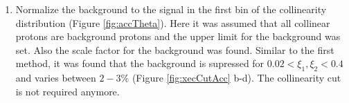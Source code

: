 \begin{enumerate}
	\item Normalize the background to the signal in the first bin  of the collinearity distribution (Figure \ref{fig:accTheta}). Here it was assumed that all collinear protons are background protons and the upper limit for the background was set. Also the scale factor for the background was found. Similar to the first method, it was found that the background is supressed for $0.02<\xi_1,\xi_2<0.4$ and varies between $2-3\%$ (Figure \ref{fig:xecCutAcc} b-d). The collinearity cut is not required anymore.
\begin{figure}[H]
	\centering
	\parbox{0.48\textwidth}{
		\centering
		\begin{subfigure}[b]{\linewidth}{
				}
		\end{subfigure}
	}
	\quad
	\parbox{0.48\textwidth}{
		\centering
		\begin{subfigure}[b]{\linewidth}{
				}

\end{subfigure}}
\end{figure}
\end{enumerate}
